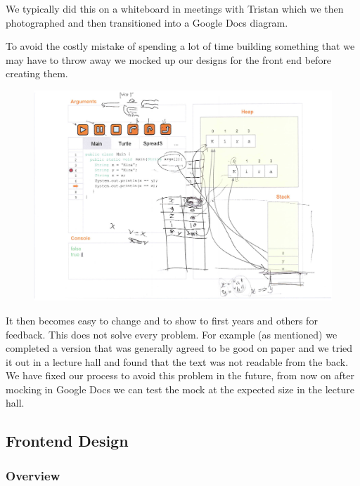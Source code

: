 \documentclass[11pt, a4paper]{article}
\begin{document}
We typically did this on a whiteboard in meetings with Tristan which we then photographed and then transitioned into a Google Docs diagram.

To avoid the costly mistake of spending a lot of time building something that we may have to throw away we mocked up our designs for the front end before creating them.
\begin{figure}[h!]
\centering
\includegraphics[width=\textwidth]{mockup.png}
\end{figure}

It then becomes easy to change and to show to first years and others for feedback. 
This does not solve every problem.
For example (as mentioned) we completed a version that was generally agreed to be good on paper and we tried it out in a lecture hall and found that the text was not readable from the back.
We have fixed our process to avoid this problem in the future, from now on after mocking in Google Docs we can test the mock at the expected size in the lecture hall.
\subsection{Frontend Design}
\subsubsection{Overview}
\end{document}

